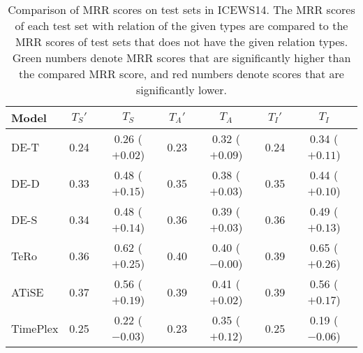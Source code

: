\begin{table*}[htb]
\centering
\begin{minipage}{0.95\textwidth}
\centering
\caption{Comparison of MRR scores on test sets in ICEWS14. The MRR scores of each test set with relation of the given types are compared to the MRR scores of test sets that does not have the given relation types. Green numbers denote MRR scores that are significantly higher than the compared MRR score, and red numbers denote scores that are significantly lower.}
\vspace{-3mm}

\begin{tabular}{l|cc|cc|cc}\hline
Model & $T_S'$ & $T_S$ & $T_A'$ & $T_A$ & $T_I'$ & $T_I$ \\ \hline
DE-T & 0.24 & 0.26 ($+0.02$) & 0.23 & 0.32 (\textcolor{textgreen}{$+0.09$}) & 0.24 & 0.34 (\textcolor{textgreen}{$+0.11$}) \\ 
DE-D & 0.33 & 0.48 (\textcolor{textgreen}{$+0.15$}) & 0.35 & 0.38 ($+0.03$) & 0.35 & 0.44 (\textcolor{textgreen}{$+0.10$}) \\ 
DE-S & 0.34 & 0.48 (\textcolor{textgreen}{$+0.14$}) & 0.36 & 0.39 ($+0.03$) & 0.36 & 0.49 (\textcolor{textgreen}{$+0.13$}) \\ 
TeRo & 0.36 & 0.62 (\textcolor{textgreen}{$+0.25$}) & 0.40 & 0.40 ($-0.00$) & 0.39 & 0.65 (\textcolor{textgreen}{$+0.26$}) \\ 
ATiSE & 0.37 & 0.56 (\textcolor{textgreen}{$+0.19$}) & 0.39 & 0.41 ($+0.02$) & 0.39 & 0.56 (\textcolor{textgreen}{$+0.17$}) \\ 
TimePlex & 0.25 & 0.22 (\textcolor{textred}{$-0.03$}) & 0.23 & 0.35 (\textcolor{textgreen}{$+0.12$}) & 0.25 & 0.19 (\textcolor{textred}{$-0.06$}) \\ 
 \hline
\end{tabular}

\label{tab:relation_properties_icews14_comparison}
\end{minipage}
\end{table*}


